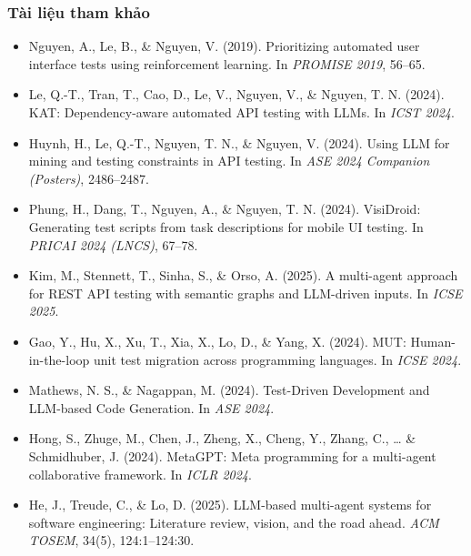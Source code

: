 \begin{frame}
    \frametitle{Tài liệu tham khảo}

    \scriptsize
    \begin{itemize}

        \item Nguyen, A., Le, B., \& Nguyen, V. (2019).
        Prioritizing automated user interface tests using reinforcement learning.
        In \textit{PROMISE 2019}, 56--65.

        \item Le, Q.-T., Tran, T., Cao, D., Le, V., Nguyen, V., \& Nguyen, T. N. (2024).
        KAT: Dependency-aware automated API testing with LLMs.
        In \textit{ICST 2024}.

        \item Huynh, H., Le, Q.-T., Nguyen, T. N., \& Nguyen, V. (2024).
        Using LLM for mining and testing constraints in API testing.
        In \textit{ASE 2024 Companion (Posters)}, 2486--2487.

        \item Phung, H., Dang, T., Nguyen, A., \& Nguyen, T. N. (2024).
        VisiDroid: Generating test scripts from task descriptions for mobile UI testing.
        In \textit{PRICAI 2024 (LNCS)}, 67--78.

        \item Kim, M., Stennett, T., Sinha, S., \& Orso, A. (2025).
        A multi-agent approach for REST API testing with semantic graphs and LLM-driven inputs.
        In \textit{ICSE 2025}. %

        \item Gao, Y., Hu, X., Xu, T., Xia, X., Lo, D., \& Yang, X. (2024).
        MUT: Human-in-the-loop unit test migration across programming languages.
        In \textit{ICSE 2024}.

        \item Mathews, N. S., \& Nagappan, M. (2024).
        Test-Driven Development and LLM-based Code Generation.
        In \textit{ASE 2024}.

        \item Hong, S., Zhuge, M., Chen, J., Zheng, X., Cheng, Y., Zhang, C., \ldots{} \& Schmidhuber, J. (2024).
        MetaGPT: Meta programming for a multi-agent collaborative framework.
        In \textit{ICLR 2024}.

        \item He, J., Treude, C., \& Lo, D. (2025).
        LLM-based multi-agent systems for software engineering: Literature review, vision, and the road ahead.
        \textit{ACM TOSEM}, 34(5), 124:1--124:30.

    \end{itemize}
\end{frame}